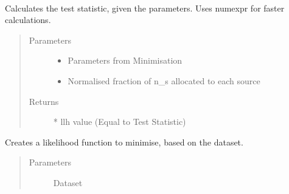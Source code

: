 \documentclass[letterpaper,10pt,english]{sphinxmanual}
\begin{document}
\begin{fulllineitems}
\label{\detokenize{index:flarestack.core.llh.StandardOverlappingLLH}}~

\begin{fulllineitems}
\label{\detokenize{index:flarestack.core.llh.StandardOverlappingLLH.calculate_test_statistic}}
Calculates the test statistic, given the parameters. Uses numexpr
for faster calculations.
\begin{quote}\begin{description}
\item[{Parameters}] \leavevmode\begin{itemize}
\item {} 
 \textendash{} Parameters from Minimisation

\item {} 
 \textendash{} Normalised fraction of n\_s allocated to each source

\end{itemize}

\item[{Returns}]  * llh value (Equal to Test Statistic)

\end{description}\end{quote}

\end{fulllineitems}


\begin{fulllineitems}
\label{\detokenize{index:flarestack.core.llh.StandardOverlappingLLH.create_kwargs}}
Creates a likelihood function to minimise, based on the dataset.
\begin{quote}\begin{description}
\item[{Parameters}] \leavevmode
{} \textendash{} Dataset


\end{description}
\end{quote}
\end{fulllineitems}
\end{fulllineitems}
\end{document}
